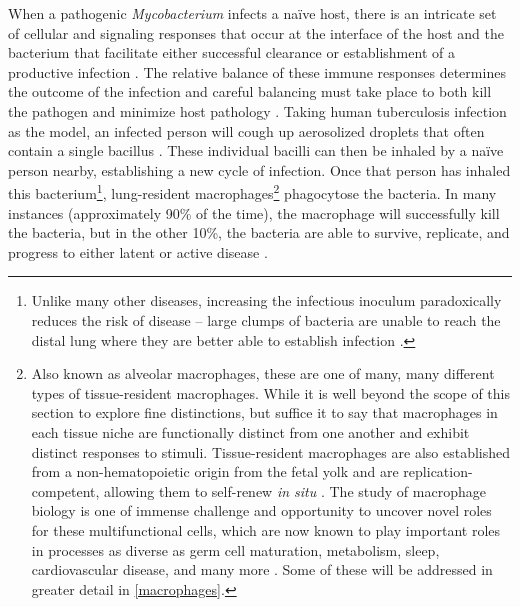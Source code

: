 When a pathogenic \textit{Mycobacterium} infects a na\"{i}ve host, there is an intricate set of cellular and signaling responses that occur at the interface of the host and the bacterium that facilitate either successful clearance or establishment of a productive infection \citep{Davies2001b, Bohrer2021, Gagneux2006a, Turner2017}. The relative balance of these immune responses determines the outcome of the infection and careful balancing must take place to both kill the pathogen and minimize host pathology \citep{Casadevall2003, Casadevall1999}. Taking human tuberculosis infection as the model, an infected person will cough up aerosolized droplets that often contain a single bacillus \citep{Churchyard2017, Mathema2017}. These individual bacilli can then be inhaled by a na\"{i}ve person nearby, establishing a new cycle of infection. Once that person has inhaled this bacterium\footnote{Unlike many other diseases, increasing the infectious inoculum paradoxically reduces the risk of disease -- large clumps of bacteria are unable to reach the distal lung where they are better able to establish infection \citep{Cambier2014b}.}, lung\hyp{}resident macrophages\footnote{Also known as alveolar macrophages, these are one of many, many different types of tissue\hyp{}resident macrophages. While it is well beyond the scope of this section to explore fine distinctions, but suffice it to say that macrophages in each tissue niche are functionally distinct from one another and exhibit distinct responses to stimuli. Tissue\hyp{}resident macrophages are also established from a non\hyp{}hematopoietic origin from the fetal yolk and are replication\hyp{}competent, allowing them to self\hyp{}renew \textit{in situ} \citep{Davies2013a, Davies2013b, Epelman2014, Ginhoux2014, Ginhoux2016}. The study of macrophage biology is one of immense challenge and opportunity to uncover novel roles for these multifunctional cells, which are now known to play important roles in processes as diverse as germ cell maturation, metabolism, sleep, cardiovascular disease, and many more \citep{Davies2013a, Hussell2014}. Some of these will be addressed in greater detail in \autoref{macrophages}.} phagocytose the bacteria. In many instances (approximately 90\% of the time), the macrophage will successfully kill the bacteria, but in the other 10\%, the bacteria are able to survive, replicate, and progress to either latent or active disease \citep{Kroidl2022, Verrall2014, North2004, Pai2016}.

